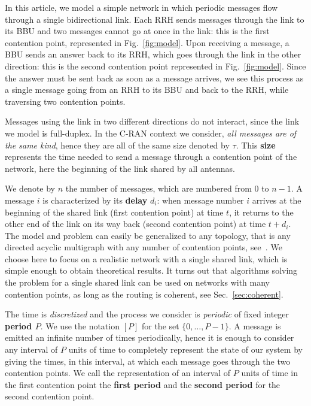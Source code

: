 \documentclass[a4paper,UKenglish,cleveref, autoref, thm-restate]{lipics-v2019}
\begin{document}
In this article, we model a simple network in which periodic messages flow through a single bidirectional link. Each RRH sends messages through the link to its BBU and two messages cannot go at once in the link: this is the first contention point, represented in Fig.~\ref{fig:model}. Upon receiving a message, a BBU sends an answer back to its RRH, which goes through the link in the other direction: this is the second contention point represented in Fig.~\ref{fig:model}. Since the answer must be sent back as soon as a message arrives, we see this process as a single message going from an RRH to its BBU and back to the RRH, while traversing two contention points. 

Messages using the link in two different directions do not interact, since the link we model is full-duplex. In the C-RAN context we consider, \emph{all messages are of the same kind}, hence they are all of the same size denoted by $\tau$. This \textbf{size} represents the time needed to send a message through a contention point of the network, here the beginning of the link shared by all antennas.

 We denote by $n$ the number of messages, which are numbered from $0$ to $n-1$. A message $i$ is characterized by its \textbf{delay} $d_i$: when message number $i$ arrives at the beginning of the shared link (first contention point) at time $t$, it returns to the other end of the link on its way back (second contention point) at time $t + d_i$. The model and problem can easily be generalized to any topology, that is any directed acyclic multigraph with any number of contention points, see~\cite{bartharxiv2018deterministic}. We choose here to focus on a realistic network with a single shared link, which is simple enough to obtain theoretical results. It turns out that algorithms solving the problem for a single shared link can be used on networks with many contention points, as long as the routing is coherent, see Sec.~\ref{sec:coherent}. 

The time is \emph{discretized} and the process we consider is \emph{periodic} of fixed integer \textbf{period $P$}. We use the notation $[P]$ for the set $\{0,\dots,P-1\}$. A message is emitted an infinite number of times periodically, hence it is enough to consider any interval of $P$ units of time to completely represent the state of our system by giving the times, in this interval, at which each message goes through the two contention points. We call the representation of an interval of $P$ units of time in the first contention point the \textbf{first period} and the \textbf{second period} for the second contention point. 
\end{document}
